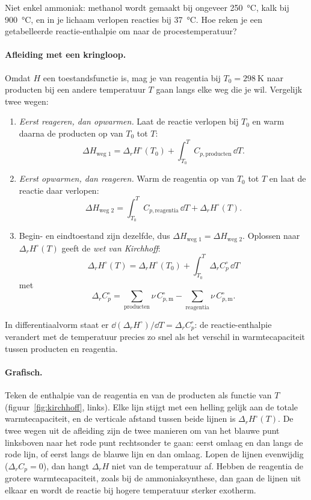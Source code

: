 Niet enkel ammoniak: methanol wordt gemaakt bij ongeveer \SI{250}{\celsius}, kalk bij \SI{900}{\celsius}, en in je lichaam verlopen reacties bij \SI{37}{\celsius}. Hoe reken je een getabelleerde reactie-enthalpie om naar de procestemperatuur?

\paragraph{Afleiding met een kringloop.} Omdat $H$ een toestandsfunctie is, mag je van reagentia bij $T_0 = \SI{298}{\kelvin}$ naar producten bij een andere temperatuur $T$ gaan langs elke weg die je wil. Vergelijk twee wegen:
\begin{enumerate}
\item \emph{Eerst reageren, dan opwarmen.} Laat de reactie verlopen bij $T_0$ en warm daarna de producten op van $T_0$ tot $T$:
\[
\Delta H_\text{weg 1} = \Delta_r H^\circ(T_0) + \int_{T_0}^{T} C_{p,\text{producten}}\,\dd T .
\]
\item \emph{Eerst opwarmen, dan reageren.} Warm de reagentia op van $T_0$ tot $T$ en laat de reactie daar verlopen:
\[
\Delta H_\text{weg 2} = \int_{T_0}^{T} C_{p,\text{reagentia}}\,\dd T + \Delta_r H^\circ(T) .
\]
\item Begin- en eindtoestand zijn dezelfde, dus $\Delta H_\text{weg 1} = \Delta H_\text{weg 2}$. Oplossen naar $\Delta_r H^\circ(T)$ geeft de \emph{wet van Kirchhoff}:
\begin{equation}
\boxed{\;\Delta_r H^\circ(T) = \Delta_r H^\circ(T_0) + \int_{T_0}^{T} \Delta_r C_p^\circ\,\dd T\;}
\label{eq:kirchhoff}
\end{equation}
met
\[
\Delta_r C_p^\circ = \sum_\text{producten} \nu\, C_{p,\mathrm{m}}^\circ - \sum_\text{reagentia} \nu\, C_{p,\mathrm{m}}^\circ .
\]
\end{enumerate}
In differentiaalvorm staat er $\dd(\Delta_r H^\circ)/\dd T = \Delta_r C_p^\circ$: de reactie-enthalpie verandert met de temperatuur precies zo snel als het verschil in warmtecapaciteit tussen producten en reagentia.

\paragraph{Grafisch.} Teken de enthalpie van de reagentia en van de producten als functie van $T$ (figuur~\ref{fig:kirchhoff}, links). Elke lijn stijgt met een helling gelijk aan de totale warmtecapaciteit, en de verticale afstand tussen beide lijnen is $\Delta_r H^\circ(T)$. De twee wegen uit de afleiding zijn de twee manieren om van het blauwe punt linksboven naar het rode punt rechtsonder te gaan: eerst omlaag en dan langs de rode lijn, of eerst langs de blauwe lijn en dan omlaag. Lopen de lijnen evenwijdig ($\Delta_r C_p = 0$), dan hangt $\Delta_r H$ niet van de temperatuur af. Hebben de reagentia de grotere warmtecapaciteit, zoals bij de ammoniaksynthese, dan gaan de lijnen uit elkaar en wordt de reactie bij hogere temperatuur sterker exotherm.

